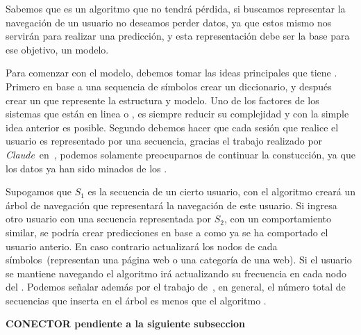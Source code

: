 % 
% 

Sabemos que \lzSieteOcho es un algoritmo que no tendrá pérdida, si buscamos representar la navegación de un usuario no deseamos perder datos, ya que estos mismo nos servirán para realizar una predicción, y esta representación debe ser la base para ese objetivo, un modelo.

Para comenzar con el modelo, debemos tomar las ideas principales que tiene \lzSieteOcho. Primero en base a una sequencia de símbolos crear un diccionario, y después crear un \trie que represente la estructura y modelo. Uno de los factores de los sistemas que están en linea o \webs, es siempre reducir su complejidad y con la simple idea anterior es posible. Segundo debemos hacer que cada sesión que realice el usuario es representado por una secuencia, gracias el trabajo realizado por \emph{Claude}~\etal en~\cite{Claude2014}, podemos solamente preocuparnos de continuar la constucción, ya que los datos ya han sido minados de los \webasccesslog.



Supogamos que $S_{1}$ es la secuencia de un cierto usuario, con el  algoritmo \lzSieteOcho creará un árbol de navegación que representará la navegación de este usuario. Si ingresa otro usuario con una secuencia representada por $S_{2}$, con un comportamiento similar, se podría crear predicciones en base a como ya se ha comportado el usuario anterio. En caso contrario actualizará los nodos de cada símbolos~(representan una página web o una categoría de una web). Si el usuario se mantiene navegando el algoritmo irá actualizando su frecuencia en cada nodo del \trie. Podemos señalar además por el trabajo de~\cite{Begleiter2004}, en general, el número total de secuencias que inserta en el árbol es menos que el algoritmo \PPM.  








\textbf{CONECTOR pendiente a la siguiente subseccion}